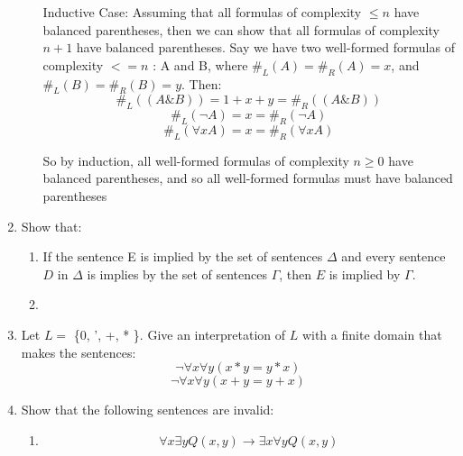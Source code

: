 \begin{enumerate}
\begin{enumerate}
        Inductive Case: Assuming that all formulas of complexity $\leq n$ have balanced parentheses, then we can show that all formulas of complexity $n+1$ have balanced parentheses. Say we have two well-formed formulas of complexity $<= n$ : A and B, where $\#_L(A) = \#_R(A) = x$, and $\#_L(B) = \#_R(B) = y$. Then:
        $$\#_L((A\&B)) = 1 + x + y = \#_R((A\&B))$$
        $$\#_L(\neg A) = x = \#_R(\neg A)$$
        $$\#_L(\forall x A) = x = \#_R(\forall x A)$$

        So by induction, all well-formed formulas of complexity $n \geq 0$ have balanced parentheses, and so all well-formed formulas must have balanced parentheses

    \end{enumerate}


  \item 
    \begin{question}
      Show that:
    \end{question}

    \begin{enumerate}
      \item
        \begin{question}
          If the sentence E is implied by the set of sentences $\Delta$ and every sentence $D$ in $\Delta$ is implies by the set of sentences $\Gamma$, then $E$ is implied by $\Gamma$.
        \end{question}

      \item 
    \end{enumerate}

  \item 
    \begin{question}
      Let $L = $ \{0, ', +, * \}. Give an interpretation of $L$ with a finite domain that makes the sentences:
      $$\neg \forall x \forall y (x * y = y * x)$$
      $$\neg \forall x \forall y (x+y = y+x)$$
    \end{question}

  \item
    \begin{question}
      Show that the following sentences are invalid:
    \end{question}
    \begin{enumerate}
      \item 
        \begin{question}
          $$\forall x \exists y Q(x,y) \rightarrow \exists x \forall y Q(x,y)$$
        \end{question}


\end{enumerate}
\end{enumerate}
